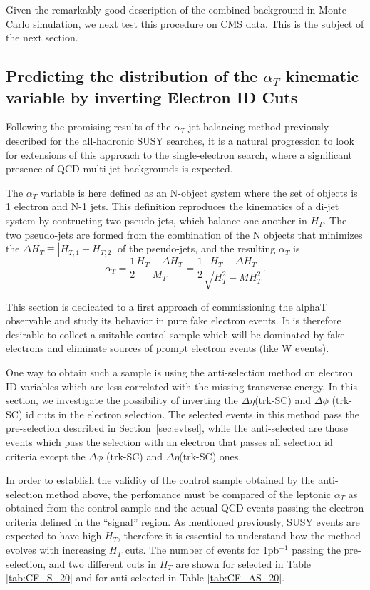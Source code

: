 Given the remarkably good description of the combined background in Monte Carlo simulation, we next test this procedure on CMS data.  This is the subject of the next section.

\subsection{Predicting the distribution of the $\alpha{_T}$ kinematic variable by inverting Electron ID Cuts}

Following the promising results of the $\alpha_{T}$ jet-balancing method previously described for the all-hadronic SUSY searches, it is a natural progression to look for extensions of this approach to the single-electron search, where a significant presence of QCD multi-jet backgrounds is expected.

The $\alpha_{T}$ variable is here defined as an N-object system where the set of objects is 1 electron and N-1 jets. This definition reproduces the kinematics of a di-jet system by contructing two pseudo-jets, which balance one another in $H_{T}$. The two pseudo-jets are formed from the combination of the N objects that minimizes the $\Delta H_{T} \equiv |H_{T,1} - H_{T,2}|$ of the pseudo-jets, and the resulting  $\alpha_{T}$ is
\begin{equation}
\alpha_{T} = \frac{1}{2} \frac{H_{T} - \Delta H_{T}}{M_{T}} =  \frac{1}{2} \frac{H_{T} - \Delta H_{T}}{\sqrt{H_{T}^{2}-MH_{T}^{2}}}.
\end{equation}

This section is dedicated to a first approach of commissioning the alphaT observable and study its behavior in pure fake electron events. It is therefore desirable to collect a suitable control sample which will be dominated by fake electrons and eliminate sources of prompt electron events (like W events).

One way to obtain such a sample is using the anti-selection method on electron ID variables which are less correlated with the missing transverse energy. In this section, we investigate the possibility of inverting the $\Delta \eta$(trk-SC) and $\Delta \phi$ (trk-SC) id cuts in the electron selection. The selected events in this method pass the pre-selection described in Section~\ref{sec:evtsel}, while the anti-selected are those events which pass the selection with an electron that passes all selection id criteria except the $\Delta \phi$ (trk-SC) and $\Delta \eta$(trk-SC) ones. 

In order to establish the validity of the control sample obtained by the anti-selection method above, the perfomance must be compared of the leptonic $\alpha_T$ as obtained from the control sample and the actual QCD events passing the electron criteria defined in the ``signal'' region. As mentioned previously, SUSY events are expected to have high $H_{T}$, therefore it is essential to understand how the method evolves with increasing $H_{T}$ cuts. The number of events for 1pb$^{-1}$ passing the pre-selection, and two different cuts in $H_{T}$ are shown for selected in Table \ref{tab:CF_S_20} and for anti-selected in Table \ref{tab:CF_AS_20}. 


